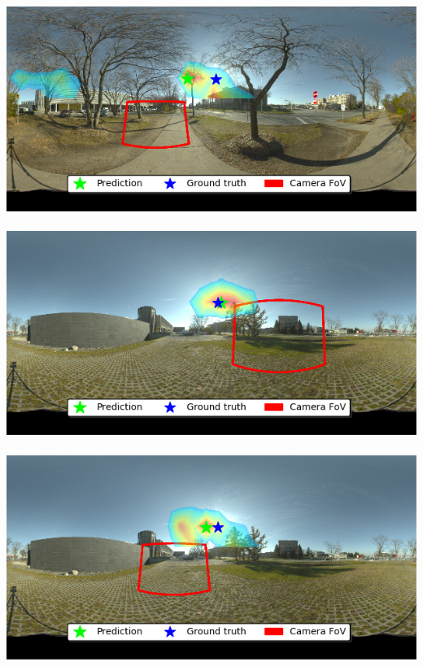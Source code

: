 \begin{minipage}{\linewidth}
\begin{multicols}{4}
\includegraphics[width=\mywidth]{AG8A2875_Panorama_hdr-corrected_007.jpg}\\
\vspace{\panoheight}\\
\includegraphics[width=\mywidth]{AG8A2917_Panorama_hdr-corrected.jpg}\\
\vspace{\panoheight}\\
\includegraphics[width=\mywidth]{AG8A2917_Panorama_hdr-corrected_003.jpg}\\


\end{multicols}
\end{minipage}


